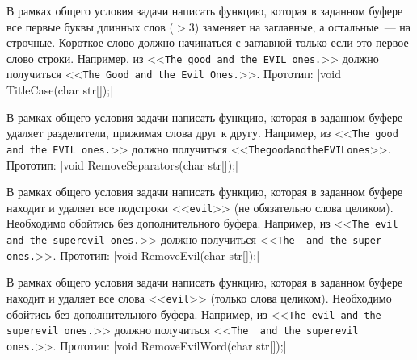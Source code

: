 
\begin{zztask}[Заголовок]
В рамках общего условия задачи написать функцию, которая в заданном буфере
все первые буквы длинных слов ($>3$) заменяет на заглавные, а остальные~--- на
строчные. Короткое слово должно начинаться с заглавной только если это первое
слово строки.
Например, из
<<\texttt{The good and the EVIL ones.}>>
должно получиться
<<\texttt{The Good and the Evil Ones.}>>.
%
Прототип: |void TitleCase(char str[]);|
\end{zztask}


\begin{zztask}
В рамках общего условия задачи написать функцию, которая в заданном буфере
удаляет разделители, прижимая слова друг к другу.
Например, из
<<\texttt{The good and the EVIL ones.}>>
должно получиться\linebreak
<<\texttt{ThegoodandtheEVILones}>>.
%
Прототип: |void RemoveSeparators(char str[]);|
\end{zztask}


\begin{zztask}
В рамках общего условия задачи написать функцию, которая в заданном буфере
находит и удаляет все подстроки <<\texttt{evil}>> (не обязательно слова целиком).
Необходимо обойтись без дополнительного буфера.
Например, из
<<\texttt{The evil and the superevil ones.}>>
должно получиться
<<\texttt{The \ and the super ones.}>>.
%
Прототип: |void RemoveEvil(char str[]);|
\end{zztask}


\begin{zztask}
В рамках общего условия задачи написать функцию, которая в заданном буфере
находит и удаляет все слова <<\texttt{evil}>> (только слова целиком).
Необходимо обойтись без дополнительного буфера.
Например, из
<<\texttt{The evil and the superevil ones.}>>
должно получиться
<<\texttt{The \ and the superevil ones.}>>.
%
Прототип: |void RemoveEvilWord(char str[]);|
\end{zztask}

